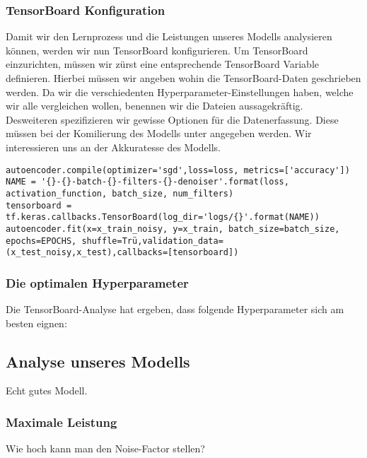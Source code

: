 \subsubsection{TensorBoard Konfiguration}
Damit wir den Lernprozess und die Leistungen unseres Modells analysieren
können, werden wir nun TensorBoard konfigurieren.
Um TensorBoard einzurichten, müssen wir zürst eine entsprechende TensorBoard
Variable definieren. Hierbei müssen wir angeben wohin die TensorBoard-Daten
geschrieben werden. Da wir die verschiedenten Hyperparameter-Einstellungen
haben, welche wir alle vergleichen wollen, benennen wir die Dateien
aussagekräftig. \\
Desweiteren spezifizieren wir gewisse Optionen für die Datenerfassung.
Diese müssen bei der Komilierung des Modells unter  angegeben
werden. Wir interessieren uns an der Akkuratesse des Modells.
\begin{verbatim}
autoencoder.compile(optimizer='sgd',loss=loss, metrics=['accuracy'])
NAME = '{}-{}-batch-{}-filters-{}-denoiser'.format(loss, activation_function, batch_size, num_filters)
tensorboard =
tf.keras.callbacks.TensorBoard(log_dir='logs/{}'.format(NAME))
autoencoder.fit(x=x_train_noisy, y=x_train, batch_size=batch_size, epochs=EPOCHS, shuffle=Trü,validation_data=(x_test_noisy,x_test),callbacks=[tensorboard])
\end{verbatim}

\subsubsection{Die optimalen Hyperparameter}
Die TensorBoard-Analyse hat ergeben, dass folgende Hyperparameter sich am besten eignen:

\subsection{Analyse unseres Modells}
Echt gutes Modell.
\subsubsection{Maximale Leistung}
Wie hoch kann man den Noise-Factor stellen?


